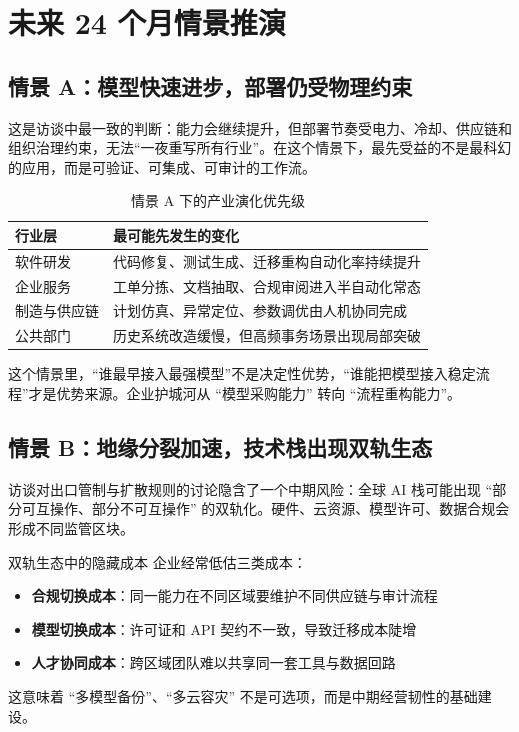 \section{未来 24 个月情景推演}

\subsection{情景 A：模型快速进步，部署仍受物理约束}

这是访谈中最一致的判断：能力会继续提升，但部署节奏受电力、冷却、供应链和组织治理约束，无法``一夜重写所有行业''。在这个情景下，最先受益的不是最科幻的应用，而是可验证、可集成、可审计的工作流。

\begin{table}[H]
\centering
\begin{tabular}{lp{8.8cm}}
\toprule
\textbf{行业层} & \textbf{最可能先发生的变化} \\
\midrule
软件研发 & 代码修复、测试生成、迁移重构自动化率持续提升 \\
企业服务 & 工单分拣、文档抽取、合规审阅进入半自动化常态 \\
制造与供应链 & 计划仿真、异常定位、参数调优由人机协同完成 \\
公共部门 & 历史系统改造缓慢，但高频事务场景出现局部突破 \\
\bottomrule
\end{tabular}
\caption{情景 A 下的产业演化优先级}
\end{table}

这个情景里，``谁最早接入最强模型''不是决定性优势，``谁能把模型接入稳定流程''才是优势来源。企业护城河从 ``模型采购能力'' 转向 ``流程重构能力''。

\subsection{情景 B：地缘分裂加速，技术栈出现双轨生态}

访谈对出口管制与扩散规则的讨论隐含了一个中期风险：全球 AI 栈可能出现 ``部分可互操作、部分不可互操作'' 的双轨化。硬件、云资源、模型许可、数据合规会形成不同监管区块。

\begin{warningbox}{双轨生态中的隐藏成本}
企业经常低估三类成本：
\begin{itemize}
    \item \textbf{合规切换成本}：同一能力在不同区域要维护不同供应链与审计流程
    \item \textbf{模型切换成本}：许可证和 API 契约不一致，导致迁移成本陡增
    \item \textbf{人才协同成本}：跨区域团队难以共享同一套工具与数据回路
\end{itemize}

这意味着 ``多模型备份''、``多云容灾'' 不是可选项，而是中期经营韧性的基础建设。
\end{warningbox}

